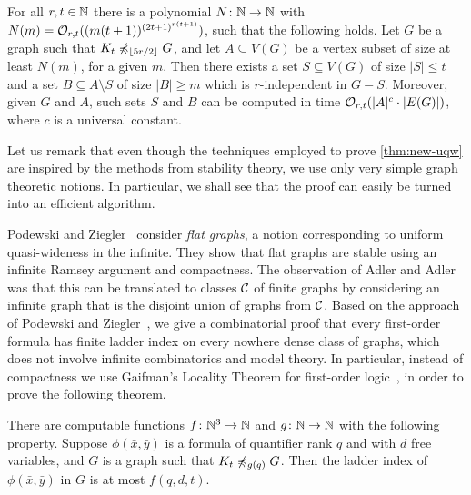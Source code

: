 \begin{theorem}\label{thm:new-uqw}
For all $r,t\in \mathbb{N}$ there is a polynomial  $N\colon \mathbb{N}\to \mathbb{N}$ with $N(m)=
\mathcal{O}_{r,t}{((m(t+1))^{{(2t+1)}^{r(t+1)}})}$, such that the following holds.
Let $G$ be a graph such that $K_t\not\preccurlyeq_{\lfloor 5r/2\rfloor} G$, and
let $A\subseteq V(G)$ be a vertex subset of size at least $N(m)$, for a given $m$.
Then there exists a set $S\subseteq V(G)$ of size $|S|\leq t$ and a set $B\subseteq A\setminus S$ 
of size $|B|\geq m$ which is $r$-independent in $G-S$.
Moreover, given $G$ and $A$, such sets $S$ and $B$ can be computed in time $\mathcal{O}_{r,t}(|A|^c\cdot |E(G)|)$, where $c$ is a universal constant. 
\end{theorem}

Let us remark
that even though the techniques employed to prove \cref{thm:new-uqw} are inspired by the methods from stability theory, 
we use only very simple graph theoretic notions. In particular, we shall see that the
proof can easily be turned into an efficient algorithm.

 Podewski and Ziegler~\cite{podewski1978stable} 
consider \emph{flat graphs}, a notion corresponding to uniform quasi-wideness in the 
infinite. They show that  flat graphs are stable using an 
infinite Ramsey argument and compactness. The observation of Adler and Adler~\cite{adler2014interpreting} was that
this can be translated to classes $\mathcal{C}$ of finite graphs by considering an infinite graph that is the disjoint union of graphs from $\mathcal{C}$.
Based on the approach of Podewski and Ziegler~\cite{podewski1978stable}, we give a combinatorial 
proof that every first-order formula has finite ladder index on every
nowhere dense class of graphs, which does not involve infinite combinatorics and model theory.
In particular, instead of compactness we use Gaifman's Locality Theorem for
first-order logic~\cite{gaifman1982local}, in order to prove the following theorem.

\begin{theorem}\label{thm:new-stable}
  There are computable functions $f\colon \mathbb{N}^3\to\mathbb{N}$ and $g\colon\mathbb{N}\to\mathbb{N}$ with the following property.
Suppose $\phi(\bar x,\bar y)$ is a formula of quantifier rank $q$ and with $d$ free variables,
and $G$ is a graph such that $K_t\not\preccurlyeq_{g(q)} G$. Then the ladder index of $\phi(\bar x,\bar y)$ in $G$ is at most $f(q,d,t)$.
\end{theorem}

%

